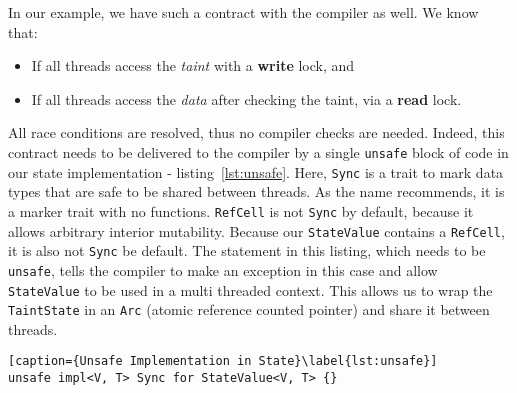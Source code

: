 In our example, we have such a contract with the compiler as well. We know that:

\begin{itemize}
	\item If all threads access the \textit{taint} with a \textbf{write} lock, and
	\item If all threads access the \textit{data} after checking the taint, via a \textbf{read} lock.
\end{itemize}

All race conditions are resolved, thus no compiler checks are needed. Indeed, this contract needs to
be delivered to the compiler by a single \texttt{unsafe} block of code in our state
implementation - listing~\ref{lst:unsafe}. 
Here, \texttt{Sync} is a trait to mark data types that are safe to be shared between threads. As the name
recommends, it is a marker trait with no functions. \texttt{RefCell} is not \texttt{Sync} by
default, because it allows arbitrary interior mutability. Because our \texttt{StateValue} contains
a \texttt{RefCell}, it is also not \texttt{Sync} be default. The statement in this listing, which needs to be
\texttt{unsafe}, tells the compiler to make an exception in this case and allow \texttt{StateValue}
to be used in a multi threaded context. This allows us to wrap the \texttt{TaintState} in an
\texttt{Arc} (atomic reference counted pointer) and share it between threads.


\begin{lstlisting}[caption={Unsafe Implementation in State}\label{lst:unsafe}]
unsafe impl<V, T> Sync for StateValue<V, T> {}
\end{lstlisting}




